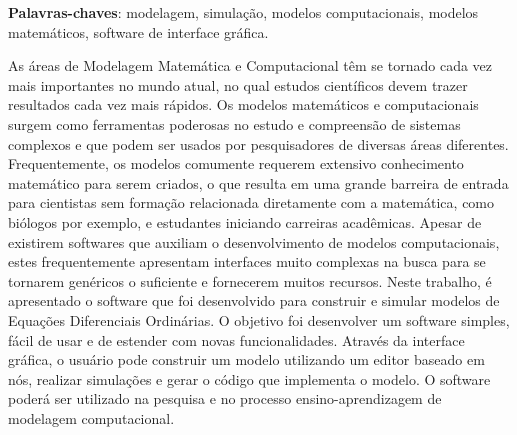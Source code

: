 \begin{resumo}
	
	
	\vspace{\onelineskip}
	
	\noindent
	\textbf{Palavras-chaves}: modelagem, simulação, modelos computacionais, modelos matemáticos, software de interface gráfica.
	
	As áreas de Modelagem Matemática e Computacional têm se tornado cada vez mais importantes no mundo atual, no qual estudos científicos devem trazer resultados cada vez mais rápidos. Os modelos matemáticos e computacionais surgem como ferramentas poderosas no estudo e compreensão de sistemas complexos e que podem ser usados por pesquisadores de diversas áreas diferentes. Frequentemente, os modelos comumente requerem extensivo conhecimento matemático para serem criados, o que resulta em uma grande barreira de entrada para cientistas sem formação relacionada diretamente com a matemática, como biólogos por exemplo, e estudantes iniciando carreiras acadêmicas. Apesar de existirem softwares que auxiliam o desenvolvimento de modelos computacionais, estes frequentemente apresentam interfaces muito complexas na busca para se tornarem genéricos o suficiente e fornecerem muitos recursos. Neste trabalho, é apresentado o software que foi desenvolvido para construir e simular modelos de Equações Diferenciais Ordinárias. O objetivo foi desenvolver um software simples, fácil de usar e de estender com novas funcionalidades. Através da interface gráfica, o usuário pode construir um modelo utilizando um editor baseado em nós, realizar simulações e gerar o código que implementa o modelo. O software poderá ser utilizado na pesquisa e no processo ensino-aprendizagem de modelagem computacional. 
	
\end{resumo}

